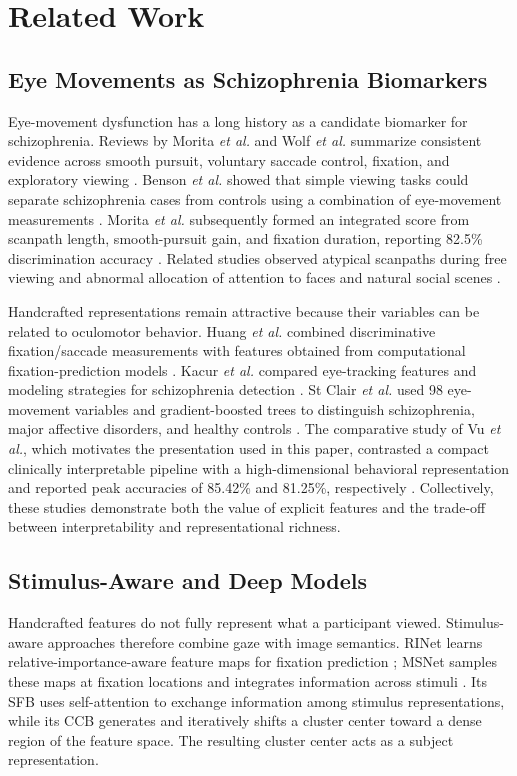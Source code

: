 \documentclass[conference,a4paper]{IEEEtran}
\begin{document}
\section{Related Work}
\subsection{Eye Movements as Schizophrenia Biomarkers}
Eye-movement dysfunction has a long history as a candidate biomarker for schizophrenia. Reviews by Morita \emph{et al.} and Wolf \emph{et al.} summarize consistent evidence across smooth pursuit, voluntary saccade control, fixation, and exploratory viewing \cite{morita2020characteristics,wolf2021review}. Benson \emph{et al.} showed that simple viewing tasks could separate schizophrenia cases from controls using a combination of eye-movement measurements \cite{benson2012simple}. Morita \emph{et al.} subsequently formed an integrated score from scanpath length, smooth-pursuit gain, and fixation duration, reporting 82.5\% discrimination accuracy \cite{morita2017integrated}. Related studies observed atypical scanpaths during free viewing and abnormal allocation of attention to faces and natural social scenes \cite{beedie2011atypical,manor1999face,patel2020social}.

Handcrafted representations remain attractive because their variables can be related to oculomotor behavior. Huang \emph{et al.} combined discriminative fixation/saccade measurements with features obtained from computational fixation-prediction models \cite{huang2020effective}. Kacur \emph{et al.} compared eye-tracking features and modeling strategies for schizophrenia detection \cite{kacur2020analysis}. St Clair \emph{et al.} used 98 eye-movement variables and gradient-boosted trees to distinguish schizophrenia, major affective disorders, and healthy controls \cite{stclair2022patterns}. The comparative study of Vu \emph{et al.}, which motivates the presentation used in this paper, contrasted a compact clinically interpretable pipeline with a high-dimensional behavioral representation and reported peak accuracies of 85.42\% and 81.25\%, respectively \cite{vu2026comparative}. Collectively, these studies demonstrate both the value of explicit features and the trade-off between interpretability and representational richness.

\subsection{Stimulus-Aware and Deep Models}
Handcrafted features do not fully represent what a participant viewed. Stimulus-aware approaches therefore combine gaze with image semantics. RINet learns relative-importance-aware feature maps for fixation prediction \cite{song2023rinet}; MSNet samples these maps at fixation locations and integrates information across stimuli \cite{song2024ems}. Its SFB uses self-attention to exchange information among stimulus representations, while its CCB generates and iteratively shifts a cluster center toward a dense region of the feature space. The resulting cluster center acts as a subject representation.
\end{document}
